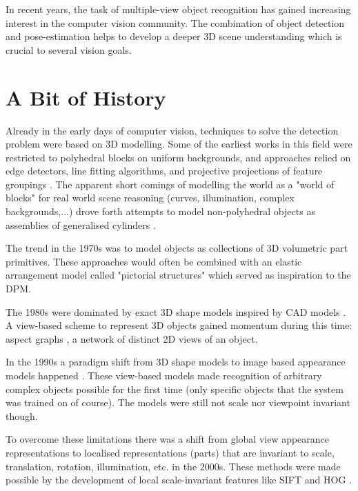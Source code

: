 In recent years, the task of multiple-view object recognition has gained increasing interest in the computer vision community. The combination of object detection and pose-estimation helps to develop a deeper 3D scene understanding which is crucial to several vision goals. 

\section{A Bit of History}
Already in the early days of computer vision, techniques to solve the detection problem were based on 3D modelling. Some of the earliest works in this field were restricted to polyhedral blocks on uniform backgrounds, and approaches relied on edge detectors, line fitting algorithms, and projective projections of feature groupings \cite{books/garland/Roberts63}. The apparent short comings of modelling the world as a "world of blocks" for real world scene reasoning (curves, illumination, complex backgrounds,...) drove forth attempts to model non-polyhedral objects as assemblies of generalised cylinders \cite{agin1972representation}. 

The trend in the 1970s was to model objects as collections of 3D volumetric part primitives. These approaches would often be combined with an elastic arrangement model called "pictorial structures" \cite{fischler1973representation} which served as inspiration to the DPM. 

The 1980s were dominated by exact 3D shape models inspired by CAD models \cite{lowe1987three}. A view-based scheme to represent 3D objects gained momentum during this time: aspect graphs \cite{underwood1975visual}, a network of distinct 2D views of an object. 

In the 1990s a paradigm shift from 3D shape models to image based appearance models happened \cite{murase1995visual}. These view-based models made recognition of arbitrary complex objects possible for the first time (only specific objects that the system was trained on of course). The models were still not scale nor viewpoint invariant though.

To overcome these limitations there was a shift from global view appearance representations to localised representations (parts) that are invariant to scale, translation, rotation, illumination, etc. in the 2000s. These methods were made possible by the development of local scale-invariant features like SIFT \cite{lowe1999object} and HOG \cite{1467360}.

